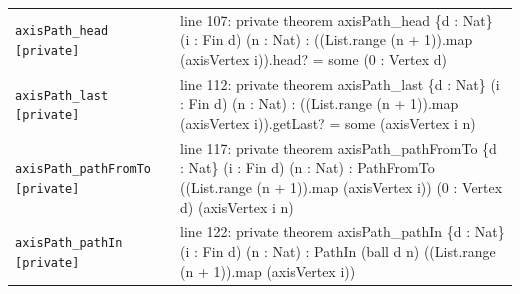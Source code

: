\documentclass[10pt]{article}
\begin{document}
\begin{longtable}{>{\raggedright\arraybackslash}p{} >{\raggedright\arraybackslash}p{}}
\texttt{axisPath\_\allowbreak{}head [private]} & {\ttfamily\scriptsize line 107:\allowbreak{} private theorem axisPath\_\allowbreak{}head \{d :\allowbreak{} Nat\} (\allowbreak{}i :\allowbreak{} Fin d)\allowbreak{} (\allowbreak{}n :\allowbreak{} Nat)\allowbreak{} :\allowbreak{} (\allowbreak{}(\allowbreak{}List.\allowbreak{}range (\allowbreak{}n +\allowbreak{} 1)\allowbreak{})\allowbreak{}.\allowbreak{}map (\allowbreak{}axisVertex i)\allowbreak{})\allowbreak{}.\allowbreak{}head? =\allowbreak{} some (\allowbreak{}0 :\allowbreak{} Vertex d)\allowbreak{}} \\[0.45em]
\texttt{axisPath\_\allowbreak{}last [private]} & {\ttfamily\scriptsize line 112:\allowbreak{} private theorem axisPath\_\allowbreak{}last \{d :\allowbreak{} Nat\} (\allowbreak{}i :\allowbreak{} Fin d)\allowbreak{} (\allowbreak{}n :\allowbreak{} Nat)\allowbreak{} :\allowbreak{} (\allowbreak{}(\allowbreak{}List.\allowbreak{}range (\allowbreak{}n +\allowbreak{} 1)\allowbreak{})\allowbreak{}.\allowbreak{}map (\allowbreak{}axisVertex i)\allowbreak{})\allowbreak{}.\allowbreak{}getLast? =\allowbreak{} some (\allowbreak{}axisVertex i n)\allowbreak{}} \\[0.45em]
\texttt{axisPath\_\allowbreak{}pathFromTo [private]} & {\ttfamily\scriptsize line 117:\allowbreak{} private theorem axisPath\_\allowbreak{}pathFromTo \{d :\allowbreak{} Nat\} (\allowbreak{}i :\allowbreak{} Fin d)\allowbreak{} (\allowbreak{}n :\allowbreak{} Nat)\allowbreak{} :\allowbreak{} PathFromTo (\allowbreak{}(\allowbreak{}List.\allowbreak{}range (\allowbreak{}n +\allowbreak{} 1)\allowbreak{})\allowbreak{}.\allowbreak{}map (\allowbreak{}axisVertex i)\allowbreak{})\allowbreak{} (\allowbreak{}0 :\allowbreak{} Vertex d)\allowbreak{} (\allowbreak{}axisVertex i n)\allowbreak{}} \\[0.45em]
\texttt{axisPath\_\allowbreak{}pathIn [private]} & {\ttfamily\scriptsize line 122:\allowbreak{} private theorem axisPath\_\allowbreak{}pathIn \{d :\allowbreak{} Nat\} (\allowbreak{}i :\allowbreak{} Fin d)\allowbreak{} (\allowbreak{}n :\allowbreak{} Nat)\allowbreak{} :\allowbreak{} PathIn (\allowbreak{}ball d n)\allowbreak{} (\allowbreak{}(\allowbreak{}List.\allowbreak{}range (\allowbreak{}n +\allowbreak{} 1)\allowbreak{})\allowbreak{}.\allowbreak{}map (\allowbreak{}axisVertex i)\allowbreak{})\allowbreak{}} \\[0.45em]

\end{longtable}
\end{document}
